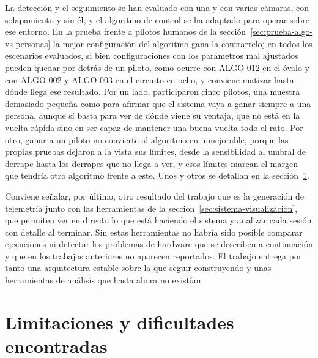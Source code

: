 La detección y el seguimiento se han evaluado con una y con varias cámaras, con solapamiento y sin él, y el algoritmo de control se ha adaptado para operar sobre ese entorno. En la prueba frente a pilotos humanos de la sección~\ref{sec:prueba-algo-vs-personas} la mejor configuración del algoritmo gana la contrarreloj en todos los escenarios evaluados, si bien configuraciones con los parámetros mal ajustados pueden quedar por detrás de un piloto, como ocurre con ALGO 012 en el óvalo y con ALGO 002 y ALGO 003 en el circuito en ocho, y conviene matizar hasta dónde llega ese resultado. Por un lado, participaron cinco pilotos, una muestra demasiado pequeña como para afirmar que el sistema vaya a ganar siempre a una persona, aunque sí basta para ver de dónde viene su ventaja, que no está en la vuelta rápida sino en ser capaz de mantener una buena vuelta todo el rato. Por otro, ganar a un piloto no convierte al algoritmo en inmejorable, porque las propias pruebas dejaron a la vista sus límites, desde la sensibilidad al umbral de derrape hasta los derrapes que no llega a ver, y esos límites marcan el margen que tendría otro algoritmo frente a este. Unos y otros se detallan en la sección~\ref{sec:limitaciones}.

Conviene señalar, por último, otro resultado del trabajo que es la generación de telemetría junto con las herramientas de la sección~\ref{sec:sistema-visualizacion}, que permiten ver en directo lo que está haciendo el sistema y analizar cada sesión con detalle al terminar. Sin estas herramientas no habría sido posible comparar ejecuciones ni detectar los problemas de hardware que se describen a continuación y que en los trabajos anteriores no aparecen reportados. El trabajo entrega por tanto una arquitectura estable sobre la que seguir construyendo y unas herramientas de análisis que hasta ahora no existían.

\section{Limitaciones y dificultades encontradas}
\label{sec:limitaciones}

